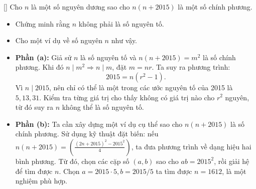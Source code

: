\documentclass[../04-diophantine-equations.tex]{subfiles}
\begin{document}
\begin{example*}\label{example:FRA-2015-TST1-P3}[\textbf{}]
	Cho \( n \) là một số nguyên dương sao cho \( n(n + 2015) \) là một số chính phương.
    \begin{itemize}[topsep=0pt, partopsep=0pt, itemsep=0pt]
        \item Chứng minh rằng \( n \) không phải là số nguyên tố.
        \item Cho một ví dụ về số nguyên \( n \) như vậy.
    \end{itemize}
\end{example*}

\begin{story*}
    \begin{itemize}[topsep=0pt, partopsep=0pt, itemsep=0pt]
        \item \textbf{Phần (a):} Giả sử \( n \) là số nguyên tố và \( n(n + 2015) = m^2 \) là số chính phương.  
        Khi đó \( n \mid m^2 \Rightarrow n \mid m \), đặt \( m = nr \). Ta suy ra phương trình:  
        \[
            2015 = n(r^2 - 1).
        \]
        Vì \( n \mid 2015 \), nên chỉ có thể là một trong các ước nguyên tố của 2015 là \( 5, 13, 31 \).  
        Kiểm tra từng giá trị cho thấy không có giá trị nào cho \( r^2 \) nguyên, từ đó suy ra \( n \) không thể là số nguyên tố.
        
        \item \textbf{Phần (b):} Ta cần xây dựng một ví dụ cụ thể sao cho \( n(n + 2015) \) là số chính phương.  
        Sử dụng kỹ thuật đặt biến: nếu \( n(n + 2015) = \left(\frac{(2n + 2015)^2 - 2015^2}{4} \right) \), ta đưa phương trình về dạng hiệu hai bình phương.  
        Từ đó, chọn các cặp số \( (a, b) \) sao cho \( ab = 2015^2 \), rồi giải hệ để tìm được \( n \).  
        Chọn \( a = 2015 \cdot 5, b = 2015/5 \) ta tìm được \( n = 1612 \), là một nghiệm phù hợp.
    \end{itemize}
\end{story*}

\bigbreak
\end{document}
